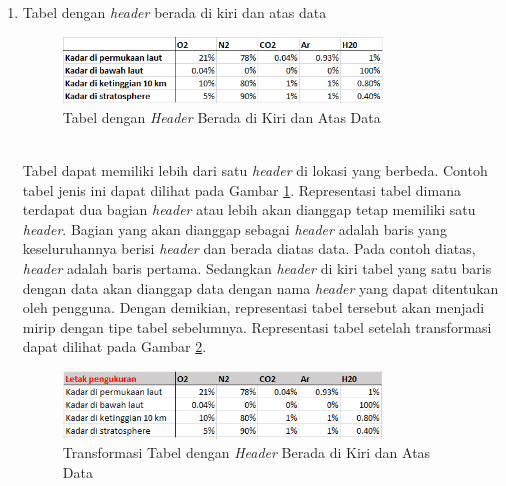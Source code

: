 \begin{enumerate}
	\item Tabel dengan \textit{header} berada di kiri dan atas data
	\begin{figure}[htbp]
	    \centering
	    \includegraphics[width=0.8\textwidth]{resources/chapter-3-tabletype-2.png}
	    \caption{Tabel dengan \textit{Header} Berada di Kiri dan Atas Data}
		\label{TabelTipe2}
	\end{figure}\\
	Tabel dapat memiliki lebih dari satu \textit{header} di lokasi yang berbeda. Contoh tabel jenis ini dapat dilihat pada Gambar \ref{TabelTipe2}. Representasi tabel dimana terdapat dua bagian \textit{header} atau lebih akan dianggap tetap memiliki satu \textit{header}. Bagian yang akan dianggap sebagai \textit{header} adalah baris yang keseluruhannya berisi \textit{header} dan berada diatas data. Pada contoh diatas, \textit{header} adalah baris pertama. Sedangkan \textit{header} di kiri tabel yang satu baris dengan data akan dianggap data dengan nama \textit{header} yang dapat ditentukan oleh pengguna. Dengan demikian, representasi tabel tersebut akan menjadi mirip dengan tipe tabel sebelumnya. Representasi tabel setelah transformasi dapat dilihat pada Gambar \ref{TabelTipe2T}.\\
	\begin{figure}[htbp]
	    \centering
	    \includegraphics[width=0.8\textwidth]{resources/chapter-3-tabletype-2-transformed.png}
	    \caption{Transformasi Tabel dengan \textit{Header} Berada di Kiri dan Atas Data}
		\label{TabelTipe2T}
	\end{figure}


\end{enumerate}
